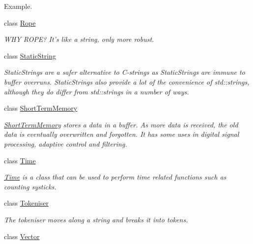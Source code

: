 \begin{DoxyCompactItemize}
\begin{DoxyCompactList}
\par
 Example. \end{DoxyCompactList}\item 
class \hyperlink{classetk_1_1_rope}{Rope}
\begin{DoxyCompactList}\small\item\em W\-H\-Y R\-O\-P\-E? It's like a string, only more robust. \end{DoxyCompactList}\item 
class \hyperlink{classetk_1_1_static_string}{Static\-String}
\begin{DoxyCompactList}\small\item\em Static\-Strings are a safer alternative to C-\/strings as Static\-Strings are immune to buffer overruns. Static\-Strings also provide a lot of the convenience of std\-::strings, although they do differ from std\-::strings in a number of ways. \end{DoxyCompactList}\item 
class \hyperlink{classetk_1_1_short_term_memory}{Short\-Term\-Memory}
\begin{DoxyCompactList}\small\item\em \hyperlink{classetk_1_1_short_term_memory}{Short\-Term\-Memory} stores a data in a buffer. As more data is received, the old data is eventually overwritten and forgotten. It has some uses in digital signal processing, adaptive control and filtering. \end{DoxyCompactList}\item 
class \hyperlink{classetk_1_1_time}{Time}
\begin{DoxyCompactList}\small\item\em \hyperlink{classetk_1_1_time}{Time} is a class that can be used to perform time related functions such as counting systicks. \end{DoxyCompactList}\item 
class \hyperlink{classetk_1_1_tokeniser}{Tokeniser}
\begin{DoxyCompactList}\small\item\em The tokeniser moves along a string and breaks it into tokens. \end{DoxyCompactList}\item 
class \hyperlink{classetk_1_1_vector}{Vector}
\end{DoxyCompactItemize}
